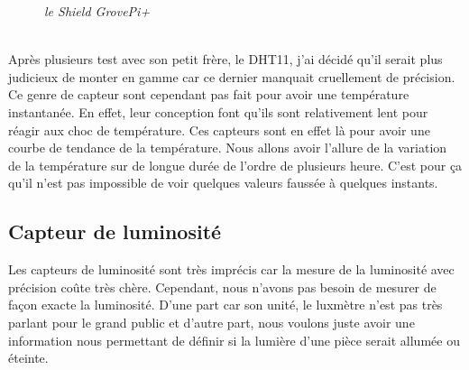 \begin{figure}[H]
\begin{center}
\end{center}
	\caption{ \textit{le Shield GrovePi+}}
\end{figure}\\

Après plusieurs test avec son petit frère, le DHT11, j'ai décidé qu'il serait plus judicieux de monter en gamme car ce dernier manquait cruellement de précision. Ce genre de capteur sont cependant pas fait pour avoir une température instantanée. En effet, leur conception font qu'ils sont relativement lent pour réagir aux choc de température. Ces capteurs sont en effet là pour avoir une courbe de tendance de la température. Nous allons avoir l'allure de la variation de la température sur de longue durée de l'ordre de plusieurs heure. C'est pour ça qu'il n'est pas impossible de voir quelques valeurs faussée à quelques instants.

\subsection{Capteur de luminosité}

Les capteurs de luminosité sont très imprécis car la mesure de la luminosité avec précision coûte très chère. Cependant, nous n'avons pas besoin de mesurer de façon exacte la luminosité. D'une part car son unité, le luxmètre n'est pas très parlant pour le grand public et d'autre part, nous voulons juste avoir une information nous permettant de définir si la lumière d'une pièce serait allumée ou éteinte.\\

